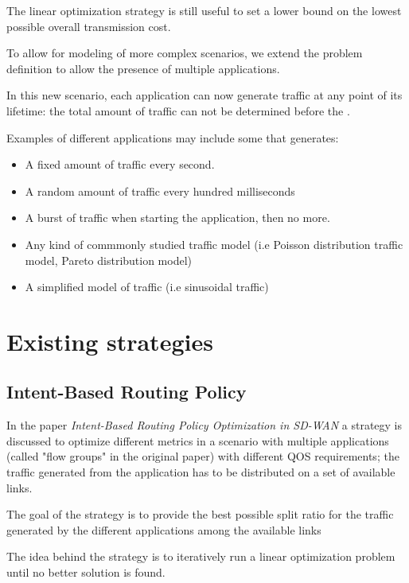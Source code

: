 \documentclass{report}
\begin{document}
The linear optimization strategy is still useful to set a lower bound on the lowest possible overall transmission cost.

To allow for modeling of more complex scenarios, we extend the problem definition to allow the presence of multiple applications.

In this new scenario, each application can now generate traffic at any point of its lifetime: the total amount of traffic can not be determined before the .

Examples of different applications may include some that generates:
\begin{itemize}
	\item A fixed amount of traffic every second.
	\item A random amount of traffic every hundred milliseconds
	\item A burst of traffic when starting the application, then no more.
	\item Any kind of commmonly studied traffic model (i.e Poisson distribution traffic model, Pareto distribution model)
	\item A simplified model of traffic (i.e sinusoidal traffic)
\end{itemize}



\section{Existing strategies}


\subsection{Intent-Based Routing Policy}

In the paper \textit{Intent-Based Routing Policy Optimization in SD-WAN} a strategy is discussed to optimize different metrics in a scenario with multiple applications (called "flow groups" in the original paper) with different QOS requirements; the traffic generated from the application has to be distributed on a set of available links.

The goal of the strategy is to provide the best possible split ratio for the traffic generated by the different applications among the available links

The idea behind the strategy is to iteratively run a linear optimization problem until no better solution is found.
\end{document}
